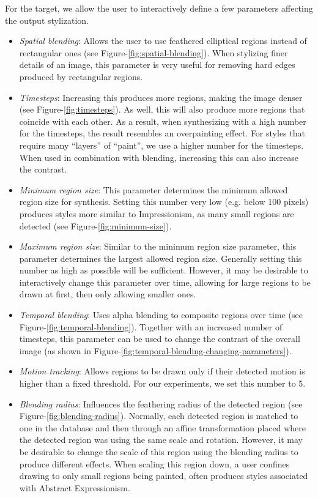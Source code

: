 \documentclass[a4paper,10pt,final]{ThesisStyle}
\begin{document}
For the target, we allow the user to interactively define a few parameters affecting the output stylization.  
\begin{itemize}
\item \textit{Spatial blending}: Allows the user to use feathered elliptical regions instead of rectangular ones (see Figure-\ref{fig:spatial-blending}).  When stylizing finer details of an image, this parameter is very useful for removing hard edges produced by rectangular regions.  
\item \textit{Timesteps}: Increasing this produces more regions, making the image denser (see Figure-\ref{fig:timesteps}).  As well, this will also produce more regions that coincide with each other.  As a result, when synthesizing with a high number for the timesteps, the result resembles an overpainting effect.  For styles that require many ``layers'' of ``paint'', we use a higher number for the timesteps.  When used in combination with blending, increasing this can also increase the contrast.
\item \textit{Minimum region size}: This parameter determines the minimum allowed region size for synthesis.  Setting this number very low (e.g. below 100 pixels) produces styles more similar to Impressionism, as many small regions are detected (see Figure-\ref{fig:minimum-size}).  
\item \textit{Maximum region size}: Similar to the minimum region size parameter, this parameter determines the largest allowed region size. Generally setting this number as high as possible will be sufficient.  However, it may be desirable to interactively change this parameter over time, allowing for large regions to be drawn at first, then only allowing smaller ones. 
\item \textit{Temporal blending}: Uses alpha blending to composite regions over time (see Figure-\ref{fig:temporal-blending}).  Together with an increased number of timesteps, this parameter can be used to change the contrast of the overall image (as shown in Figure-\ref{fig:temporal-blending-changing-parameters}).  
\item \textit{Motion tracking}: Allows regions to be drawn only if their detected motion is higher than a fixed threshold.  For our experiments, we set this number to 5.  
\item \textit{Blending radius}: Influences the feathering radius of the detected region (see Figure-\ref{fig:blending-radius}).  Normally, each detected region is matched to one in the database and then through an affine transformation placed where the detected region was using the same scale and rotation.  However, it may be desirable to change the scale of this region using the blending radius to produce different effects.  When scaling this region down, a user confines drawing to only small regions being painted, often produces styles associated with Abstract Expressionism.
\end{itemize}
\end{document}
